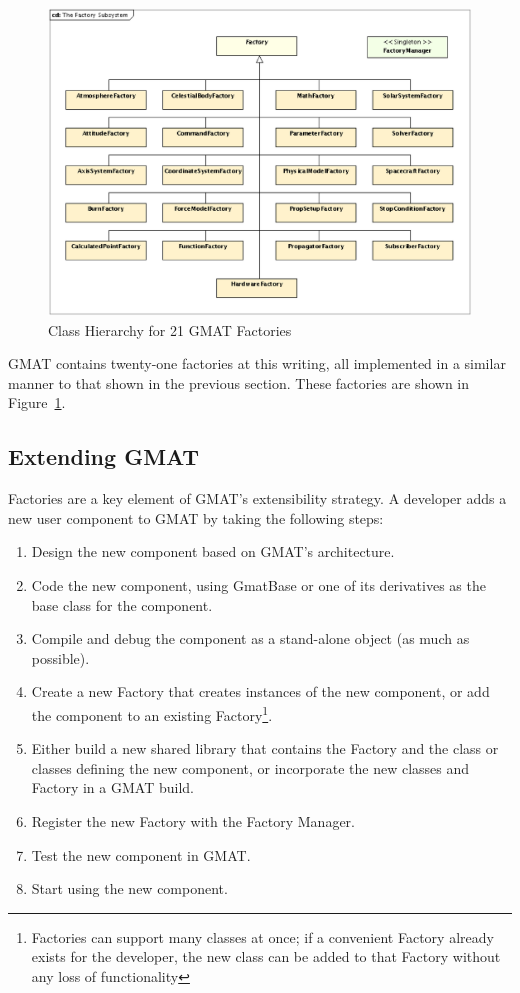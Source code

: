 \begin{figure}[htb]
\begin{center}
\includegraphics[scale=0.5]{Images/TheFactorySubsystem.eps}
\caption{\label{figure:TheFactorySubsystem}Class Hierarchy for 21 GMAT Factories}
\end{center}
\end{figure}

GMAT contains twenty-one factories at this writing, all implemented in a similar manner to that
shown in the previous section.  These factories are shown in
Figure~\ref{figure:TheFactorySubsystem}.

\subsection{\label{section:UserObjects}Extending GMAT}

Factories are a key element of GMAT's extensibility strategy.  A developer adds a new user component
to GMAT by taking the following steps:

\begin{enumerate}
  \item Design the new component based on GMAT's architecture.
  \item Code the new component, using GmatBase or one of its derivatives as the base class for the
component.
  \item Compile and debug the component as a stand-alone object (as much as possible).
  \item Create a new Factory that creates instances of the new component, or add the component to an
existing Factory\footnote{Factories can support many classes at once; if a convenient Factory
already exists for the developer, the new class can be added to that Factory without any loss of
functionality}.
  \item \label{item:RuntimeRegister}Either build a new shared library that contains the Factory and
the class or classes defining the new component, or incorporate the new classes and Factory in a
GMAT build.
  \item Register the new Factory with the Factory Manager.
  \item Test the new component in GMAT.
  \item Start using the new component.
\end{enumerate}

